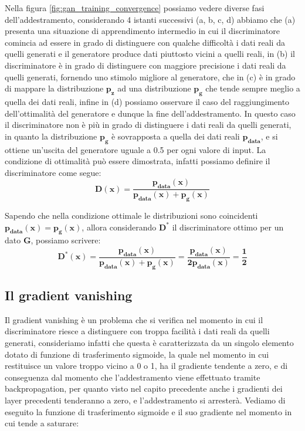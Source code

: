 Nella figura \ref{fig:gan_training_convergence} possiamo vedere diverse fasi dell'addestramento, considerando 4 istanti successivi (a, b, c, d) abbiamo che (a) 
presenta una situazione di apprendimento intermedio in cui il discriminatore comincia ad essere in grado di distinguere con qualche difficoltà i dati reali da quelli
generati e il generatore produce dati piuttosto vicini a quelli reali, in (b) il discriminatore è in grado di distinguere con maggiore precisione i dati reali da quelli
generati, fornendo uno stimolo migliore al generatore, che in (c) è in grado di mappare la distribuzione $\mathbf{p_{z}}$ ad una distribuzione
$\mathbf{p_{g}}$ che tende sempre meglio a quella dei dati reali, infine in (d) possiamo osservare il caso del raggiungimento dell'ottimalità del generatore e dunque la fine dell'addestramento.
In questo caso il discriminatore non è più in grado di distinguere i dati reali da quelli generati, in quanto la distribuzione $\mathbf{p_{g}}$ è sovrapposta 
a quella dei dati reali $\mathbf{p_{data}}$, e si ottiene un'uscita del generatore uguale a 0.5 per ogni valore di input.
La condizione di ottimalità può essere dimostrata, infatti possiamo definire il discriminatore come segue:
\begin{equation}
    \mathbf{D(x) = \frac{p_{data}(x)}{p_{data}(x) + p_{g}(x)}}
\end{equation}

Sapendo che nella condizione ottimale le distribuzioni sono coincidenti $\mathbf{p_{data}(x) = p_{g}(x)}$,
allora considerando $\mathbf{D^*}$ il discriminatore ottimo per un dato $\mathbf{G}$, possiamo scrivere:
\begin{equation}
    \mathbf{D^*(x) = \frac{p_{data}(x)}{p_{data}(x) + p_{g}(x)} = \frac{p_{data}(x)}{2p_{data}(x)} = \frac{1}{2}}
\end{equation}

\subsection{Il gradient vanishing}
\label{subsec:gradient_vanishing}
Il gradient vanishing è un problema che si verifica nel momento in cui il discriminatore riesce a distinguere con troppa facilità i dati reali da quelli generati,
consideriamo infatti che questa è caratterizzata da un singolo elemento dotato di funzione di trasferimento sigmoide, la quale nel
momento in cui restituisce un valore troppo vicino a 0 o 1, ha il gradiente tendente a zero, e di conseguenza dal momento che l'addestramento 
viene effettuato tramite backpropagation, per quanto visto nel capito precedente anche i gradienti dei layer precedenti tenderanno a zero, e l'addestramento
si arresterà. Vediamo di eseguito la funzione di trasferimento sigmoide e il suo gradiente nel momento in cui tende a saturare:

